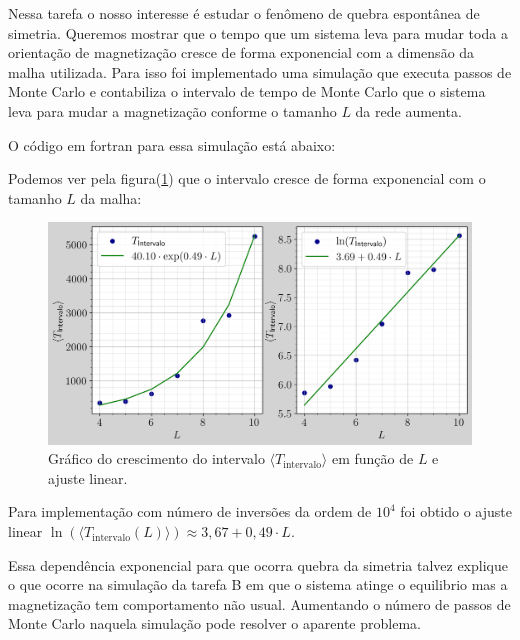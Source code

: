 Nessa tarefa o nosso interesse é estudar o fenômeno de quebra espontânea de simetria. 
Queremos mostrar que o tempo que um sistema leva para mudar toda a orientação de magnetização cresce de forma 
exponencial com a dimensão da malha utilizada. 
Para isso foi implementado uma simulação que executa passos de Monte Carlo e contabiliza o intervalo 
de tempo de Monte Carlo que o sistema leva para mudar a magnetização conforme o tamanho $L$ da rede aumenta. 

O código em fortran para essa simulação está abaixo: 



Podemos ver pela figura(\ref{fig:d_graficos}) que o intervalo cresce de forma exponencial com 
o tamanho $L$ da malha: 

\begin{figure}
    \centering
    \includegraphics[width=\linewidth]{graficos/tarefa-4/graf-tarefa-D.png}
    \caption{Gráfico do crescimento do intervalo $\langle T_\text{intervalo} \rangle$ em função de $L$ e ajuste linear.}
    \label{fig:d_graficos}
\end{figure}

Para implementação com número de inversões da ordem de $10^4$ foi obtido o ajuste linear 
$\ln\left(\langle T_{\text{intervalo}}(L)\rangle\right)  \approx 3,67 + 0,49 \cdot L$. 

Essa dependência exponencial para que ocorra quebra da simetria talvez explique o que ocorre na simulação da tarefa B
em que o sistema atinge o equilibrio mas a magnetização tem comportamento não usual. Aumentando o número de passos 
de Monte Carlo naquela simulação pode resolver o aparente problema.